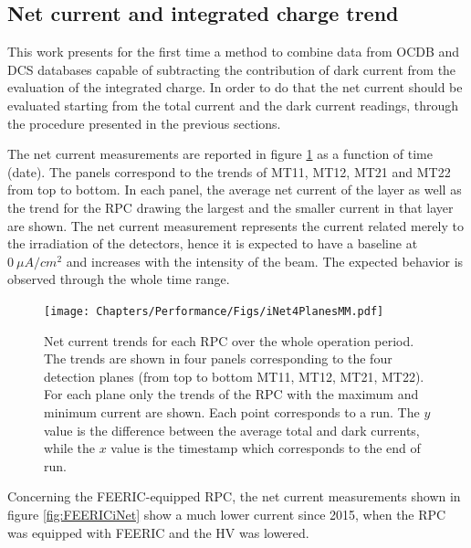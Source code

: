 \subsection{Net current and integrated charge trend}
This work presents for the first time a method to combine data from OCDB and DCS databases capable of subtracting the contribution of dark current from the evaluation of the integrated charge.
In order to do that the net current should be evaluated starting from the total current and the dark current readings, through the procedure presented in the previous sections.

The net current measurements are reported in figure \ref{fig:iNet4Planes} as a function of time (date).
The panels correspond to the trends of MT11, MT12, MT21 and MT22 from top to bottom.
In each panel, the average net current of the layer as well as the trend for the RPC drawing the largest and the smaller current in that layer are shown.
The net current measurement represents the current related merely to the irradiation of the detectors, hence it is expected to have a baseline at $0\ \mu A/cm^2$ and increases with the intensity of the beam.
The expected behavior is observed through the whole time range.

\begin{figure}[!t]
\begin{center}
\texttt{[image: Chapters/Performance/Figs/iNet4PlanesMM.pdf]}
\caption{Net current trends for each RPC over the whole operation period. The trends are shown in four panels corresponding to the four detection planes (from top to bottom MT11, MT12, MT21, MT22). For each plane only the trends of the RPC with the maximum and minimum current are shown. Each point corresponds to a run. The $y$ value is the difference between the average total and dark currents, while the $x$ value is the timestamp which corresponds to the end of run.}
\label{fig:iNet4Planes}
\end{center}
\end{figure}

Concerning the FEERIC-equipped RPC, the net current measurements shown in figure \ref{fig:FEERICiNet} show a much lower current since 2015, when the RPC was equipped with FEERIC and the HV was lowered.

